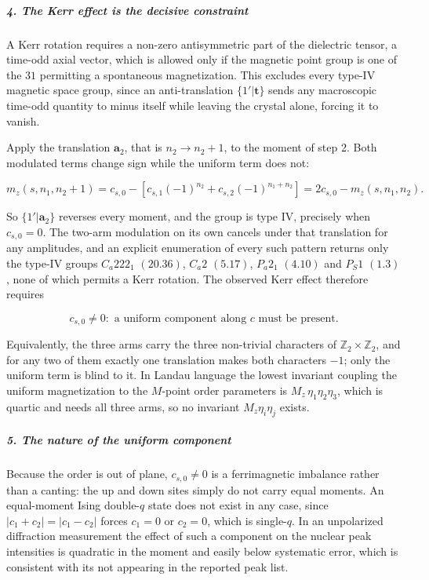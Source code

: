 \subparagraph*{4. The Kerr effect is the decisive constraint}

A Kerr rotation requires a non-zero antisymmetric part of the dielectric tensor, a time-odd axial vector, which is allowed only if the magnetic point group is one of the $31$ permitting a spontaneous magnetization. This excludes every type-IV magnetic space group, since an anti-translation $\{1'|\mathbf{t}\}$ sends any macroscopic time-odd quantity to minus itself while leaving the crystal alone, forcing it to vanish.

Apply the translation $\mathbf{a}_2$, that is $n_2\to n_2+1$, to the moment of step 2. Both modulated terms change sign while the uniform term does not:

\[
m_z(s,n_1,n_2+1)=c_{s,0}-\left[c_{s,1}(-1)^{n_2}+c_{s,2}(-1)^{n_1+n_2}\right]=2c_{s,0}-m_z(s,n_1,n_2).
\]

So $\{1'|\mathbf{a}_2\}$ reverses every moment, and the group is type IV, precisely when $c_{s,0}=0$. The two-arm modulation on its own cancels under that translation for any amplitudes, and an explicit enumeration of every such pattern returns only the type-IV groups $C_a222_1$ $(20.36)$, $C_a2$ $(5.17)$, $P_a2_1$ $(4.10)$ and $P_S1$ $(1.3)$, none of which permits a Kerr rotation. The observed Kerr effect therefore requires

\[
{ c_{s,0}\neq 0: \text{ a uniform component along } c \text{ must be present.} }
\]

Equivalently, the three arms carry the three non-trivial characters of $\mathbb{Z}_2\times\mathbb{Z}_2$, and for any two of them exactly one translation makes both characters $-1$; only the uniform term is blind to it. In Landau language the lowest invariant coupling the uniform magnetization to the $M$-point order parameters is $M_z\,\eta_1\eta_2\eta_3$, which is quartic and needs all three arms, so no invariant $M_z\eta_i\eta_j$ exists.

\subparagraph*{5. The nature of the uniform component}

Because the order is out of plane, $c_{s,0}\neq0$ is a ferrimagnetic imbalance rather than a canting: the up and down sites simply do not carry equal moments. An equal-moment Ising double-$q$ state does not exist in any case, since $|c_1+c_2|=|c_1-c_2|$ forces $c_1=0$ or $c_2=0$, which is single-$q$. In an unpolarized diffraction measurement the effect of such a component on the nuclear peak intensities is quadratic in the moment and easily below systematic error, which is consistent with its not appearing in the reported peak list.

